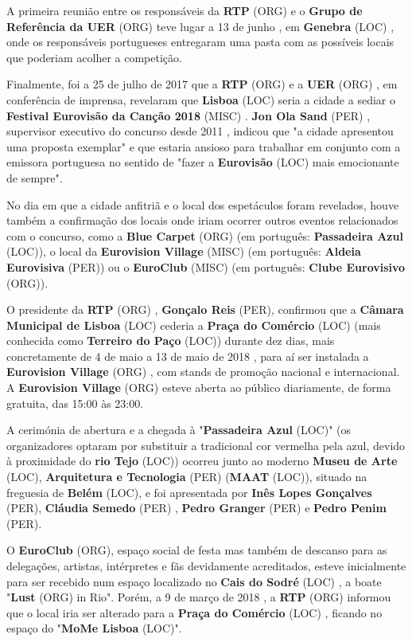 \documentclass[12pt,a4paper]{article}
\begin{document}
A primeira reunião entre os responsáveis da \textbf{RTP} (ORG) e o \textbf{Grupo de Referência da UER} (ORG) teve lugar a 13 de junho , em \textbf{Genebra} (LOC) , onde os responsáveis portugueses entregaram uma pasta com as possíveis locais que poderiam acolher a competição.

Finalmente, foi a 25 de julho de 2017 que a \textbf{RTP} (ORG) e a \textbf{UER} (ORG) , em conferência de imprensa, revelaram que \textbf{Lisboa} (LOC) seria a cidade a sediar o \textbf{Festival Eurovisão da Canção 2018} (MISC) . \textbf{Jon Ola Sand} (PER) , supervisor executivo do concurso desde 2011 , indicou que "a cidade apresentou uma proposta exemplar" e que estaria ansioso para trabalhar em conjunto com a emissora portuguesa no sentido de "fazer a \textbf{Eurovisão} (LOC) mais emocionante de sempre".

No dia em que a cidade anfitriã e o local dos espetáculos foram revelados, houve também a confirmação dos locais onde iriam ocorrer outros eventos relacionados com o concurso, como a \textbf{Blue Carpet} (ORG) (em português: \textbf{Passadeira Azul} (LOC)), o local da \textbf{Eurovision Village} (MISC) (em português: \textbf{Aldeia Eurovisiva} (PER)) ou o \textbf{EuroClub} (MISC) (em português: \textbf{Clube Eurovisivo} (ORG)).

O presidente da \textbf{RTP} (ORG) , \textbf{Gonçalo Reis} (PER), confirmou que a \textbf{Câmara Municipal de Lisboa} (LOC) cederia a \textbf{Praça do Comércio} (LOC) (mais conhecida como \textbf{Terreiro do Paço} (LOC)) durante dez dias, mais concretamente de 4 de maio a 13 de maio de 2018 , para aí ser instalada a \textbf{Eurovision Village} (ORG) , com stands de promoção nacional e internacional. A \textbf{Eurovision Village} (ORG) esteve aberta ao público diariamente, de forma gratuita, das 15:00 às 23:00.

A cerimónia de abertura e a chegada à "\textbf{Passadeira Azul} (LOC)" (os organizadores optaram por substituir a tradicional cor vermelha pela azul, devido à proximidade do \textbf{rio Tejo} (LOC)) ocorreu junto ao moderno \textbf{Museu de Arte} (LOC), \textbf{Arquitetura e Tecnologia} (PER) (\textbf{MAAT} (LOC)), situado na freguesia de \textbf{Belém} (LOC), e foi apresentada por \textbf{Inês Lopes Gonçalves} (PER), \textbf{Cláudia Semedo} (PER) , \textbf{Pedro Granger} (PER) e \textbf{Pedro Penim} (PER).

O \textbf{EuroClub} (ORG), espaço social de festa mas também de descanso para as delegações, artistas, intérpretes e fãs devidamente acreditados, esteve inicialmente para ser recebido num espaço localizado no \textbf{Cais do Sodré} (LOC) , a boate "\textbf{Lust} (ORG) in Rio". Porém, a 9 de março de 2018 , a \textbf{RTP} (ORG) informou que o local iria ser alterado para a \textbf{Praça do Comércio} (LOC) , ficando no espaço do "\textbf{MoMe Lisboa} (LOC)".
\end{document}
